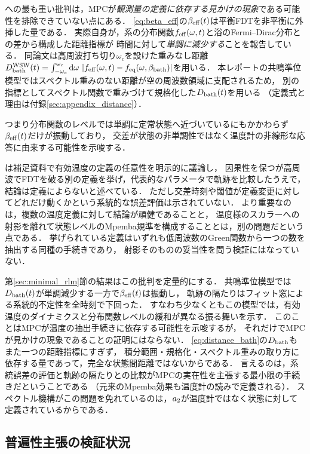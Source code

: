 \documentclass[a4paper,11pt,onecolumn,baselineskip=14.5pt]{jlreq}
\begin{document}
\cite{Wang2024}への最も重い批判は，MPCが\emph{観測量の定義に依存する見かけの現象}である可能性を排除できていない点にある．
\eqref{eq:beta_eff}の$\beta_{\mathrm{eff}}(t)$は平衡FDTを非平衡に外挿した量である．
実際\cite{Wang2024}自身が，系の分布関数$f_{\mathrm{eff}}(\omega,t)$と浴のFermi--Dirac分布との差から構成した距離指標が
時間に対して\emph{単調に減少する}ことを報告している．
同論文は高周波打ち切り$\omega_c$を設けた重みなし距離
$D_{\mathrm{bath}}^{\mathrm{WSW}}(t)=\int_{-\omega_c}^{\omega_c}\dd{\omega}\,
\abs{f_{\mathrm{eff}}(\omega,t)-f_{\mathrm{eq}}(\omega,\beta_{\mathrm{bath}})}$を用いる\cite{Wang2024}．
本レポートの共鳴準位模型ではスペクトル重みのない距離が空の周波数領域に支配されるため，
別の指標としてスペクトル関数で重みづけて規格化した$D_{\mathrm{bath}}(t)$を用いる
（定義式と理由は付録\ref{sec:appendix_distance}）．

つまり分布関数のレベルでは単調に定常状態へ近づいているにもかかわらず$\beta_{\mathrm{eff}}(t)$だけが振動しており，
交差が状態の非単調性ではなく温度計の非線形な応答に由来する可能性を示唆する．

\cite{Wang2024}は補足資料で有効温度の定義の任意性を明示的に議論し，
因果性を保つが高周波でFDTを破る別の定義を挙げ，代表的なパラメータで軌跡を比較したうえで，
結論は定義によらないと述べている．
ただし交差時刻や閾値が定義変更に対してどれだけ動くかという系統的な誤差評価は示されていない．
より重要なのは，複数の温度定義に対して結論が頑健であることと，
温度様のスカラーへの射影を離れて状態レベルのMpemba規準を構成することとは，別の問題だという点である．
挙げられている定義はいずれも低周波数のGreen関数から一つの数を抽出する同種の手続きであり，
射影そのものの妥当性を問う検証にはなっていない．

第\ref{sec:minimal_rlm}節の結果はこの批判を定量的にする．
共鳴準位模型では$D_{\mathrm{bath}}(t)$が単調減少する一方で$\beta_{\mathrm{eff}}(t)$は振動し，
軌跡の隔たりはフィット窓による系統的不定性を全時刻で下回った．
すなわち少なくともこの模型では，有効温度のダイナミクスと分布関数レベルの緩和が異なる振る舞いを示す．
このことはMPCが温度の抽出手続きに依存する可能性を示唆するが，
それだけでMPCが見かけの現象であることの証明にはならない．
\eqref{eq:distance_bath}の$D_{\mathrm{bath}}$もまた一つの距離指標にすぎず，
積分範囲・規格化・スペクトル重みの取り方に依存する量であって，完全な状態間距離ではないからである．
言えるのは，系統誤差の評価と軌跡の隔たりとの比較がMPCの実在性を主張する最小限の手続きだということである
（元来のMpemba効果も温度計の読みで定義される）．
スペクトル機構がこの問題を免れているのは，$a_{2}$が温度計ではなく状態に対して定義されているからである．

\subsection{普遍性主張の検証状況}
\label{sec:discussion_universality}
\end{document}
